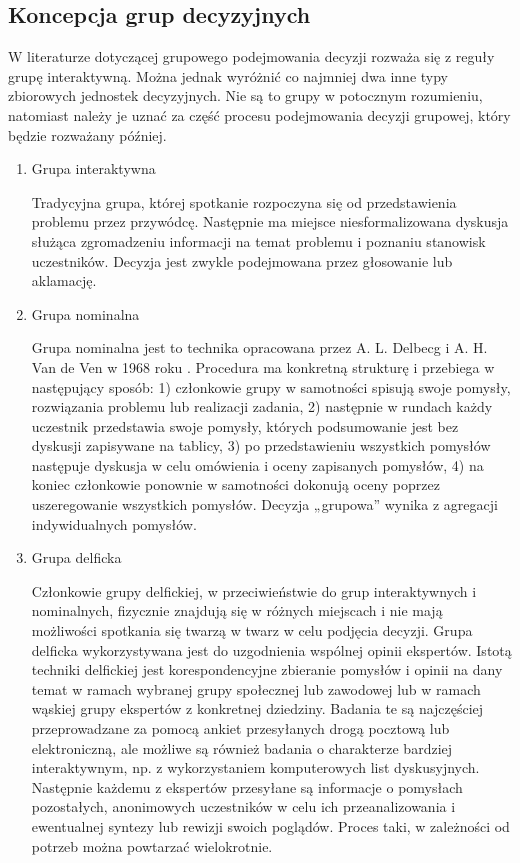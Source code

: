 \subsection{Koncepcja grup decyzyjnych}
W literaturze dotyczącej grupowego podejmowania decyzji rozważa się z reguły
grupę interaktywną. Można jednak wyróżnić co najmniej dwa inne typy zbiorowych
jednostek decyzyjnych. Nie są to grupy w potocznym rozumieniu, natomiast należy
je uznać za część procesu podejmowania decyzji grupowej, który będzie rozważany
później.
\begin{enumerate}[1)]
  \item Grupa interaktywna
  
  Tradycyjna grupa, której spotkanie rozpoczyna się od przedstawienia problemu
  przez przywódcę. Następnie ma miejsce niesformalizowana dyskusja służąca
  zgromadzeniu informacji na temat problemu i poznaniu stanowisk uczestników.
  Decyzja jest zwykle podejmowana przez głosowanie lub aklamację.

  \item Grupa nominalna
  
  Grupa nominalna jest to technika opracowana przez A. L. Delbecg i A. H. Van de
  Ven w 1968 roku \cite{VanDeVen1971}. Procedura ma konkretną strukturę i
  przebiega w następujący sposób: 1) członkowie grupy w samotności spisują swoje
  pomysły, rozwiązania problemu lub realizacji zadania, 2) następnie w rundach
  każdy uczestnik przedstawia swoje pomysły, których podsumowanie jest bez
  dyskusji zapisywane na tablicy, 3) po przedstawieniu wszystkich pomysłów
  następuje dyskusja w celu omówienia i oceny zapisanych pomysłów, 4) na koniec
  członkowie ponownie w samotności dokonują oceny poprzez uszeregowanie
  wszystkich pomysłów. Decyzja „grupowa” wynika z agregacji indywidualnych
  pomysłów.

  \item Grupa delficka
  
  Członkowie grupy delfickiej, w przeciwieństwie do grup
  interaktywnych i nominalnych, fizycznie znajdują się w różnych miejscach i
  nie mają możliwości spotkania się twarzą w twarz w celu podjęcia decyzji.
  Grupa delficka wykorzystywana jest do uzgodnienia wspólnej opinii ekspertów. 
  Istotą techniki delfickiej jest korespondencyjne zbieranie pomysłów i opinii 
  na dany temat w ramach wybranej grupy społecznej lub zawodowej lub w ramach 
  wąskiej grupy ekspertów z konkretnej dziedziny. Badania te są najczęściej 
  przeprowadzane za pomocą ankiet przesyłanych drogą pocztową lub elektroniczną,
  ale możliwe są również badania o charakterze bardziej interaktywnym, np.
  z wykorzystaniem  komputerowych list dyskusyjnych. Następnie każdemu z
  ekspertów przesyłane są informacje o pomysłach pozostałych, anonimowych 
  uczestników w celu ich przeanalizowania i ewentualnej syntezy lub rewizji 
  swoich poglądów. Proces taki, w zależności od potrzeb można powtarzać 
  wielokrotnie. \cite{Helmer-Hirschberg1967}

\end{enumerate}


